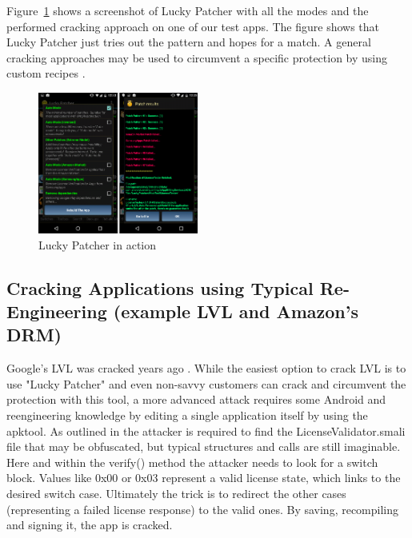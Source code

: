 \documentclass{sig-alternate}
\begin{document}
Figure~\ref{LP} shows a screenshot of Lucky Patcher with all the modes and the performed cracking approach on one of our test apps. The figure shows that Lucky Patcher just tries out the pattern and hopes for a match. A general cracking approaches may be used to circumvent a specific protection by using custom recipes \cite{neutze}.

\begin{figure}[htbp]
  \centering
  \includegraphics[width=0.47\textwidth]{LP.png}
  \caption{Lucky Patcher in action \cite{neutze}}
  \label{LP}
\end{figure}



\subsection{Cracking Applications using Typical Re-Engineering (example LVL and Amazon's DRM)}

Google's LVL was cracked years ago \cite{AT1}. While the easiest option to crack LVL is to use "Lucky Patcher" \cite{xAT2} and even non-savvy customers can crack and circumvent the protection with this tool, a more advanced attack requires some Android and reengineering knowledge by editing a single application itself by using the apktool. As outlined in \cite{AT1} the attacker is required to find the LicenseValidator.smali file that may be obfuscated, but typical structures and calls are still imaginable. Here and within the verify() method the attacker needs to look for a switch block. Values like 0x00 or 0x03 represent a valid license state, which links to the desired switch case. Ultimately the trick is to redirect the other cases (representing a failed license response) to the valid ones. By saving, recompiling and signing it, the app is cracked. 
\end{document}
